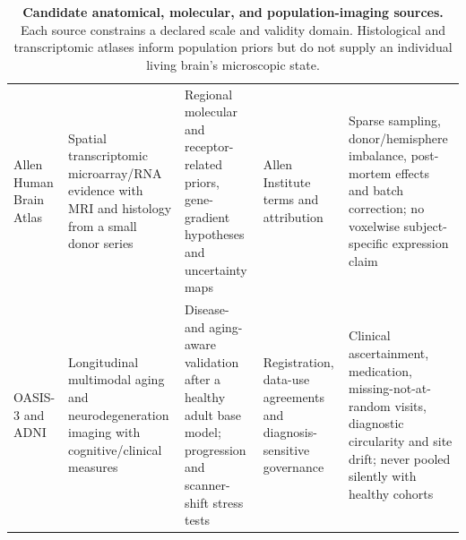 \begin{table}[!h]
\begin{tabularx}{\textwidth}{@{}p{}p{}p{}p{}X@{}}
Allen Human Brain Atlas \citep{hawrylycz2012} &
Spatial transcriptomic microarray/RNA evidence with MRI and histology from a
small donor series &
Regional molecular and receptor-related priors, gene-gradient hypotheses and
uncertainty maps &
Allen Institute terms and attribution &
Sparse sampling, donor/hemisphere imbalance, post-mortem effects and batch
correction; no voxelwise subject-specific expression claim\\

OASIS-3 and ADNI &
Longitudinal multimodal aging and neurodegeneration imaging with
cognitive/clinical measures &
Disease- and aging-aware validation after a healthy adult base model;
progression and scanner-shift stress tests &
Registration, data-use agreements and diagnosis-sensitive governance &
Clinical ascertainment, medication, missing-not-at-random visits, diagnostic
circularity and site drift; never pooled silently with healthy cohorts\\
\bottomrule
\end{tabularx}
\caption{\textbf{Candidate anatomical, molecular, and population-imaging
sources.} Each source constrains a declared scale and validity domain.
Histological and transcriptomic atlases inform population priors but do not
supply an individual living brain's microscopic state.}
\label{tab:appendix-anatomy}
\end{table}

